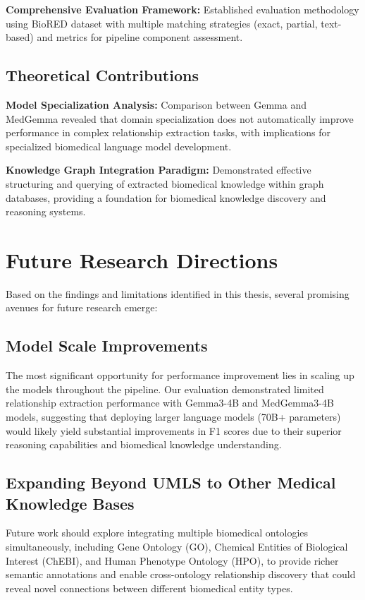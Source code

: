 \textbf{Comprehensive Evaluation Framework:} Established evaluation methodology using BioRED dataset with multiple matching strategies (exact, partial, text-based) and metrics for pipeline component assessment.

\subsection{Theoretical Contributions}

\textbf{Model Specialization Analysis:} Comparison between Gemma and MedGemma revealed that domain specialization does not automatically improve performance in complex relationship extraction tasks, with implications for specialized biomedical language model development.

\textbf{Knowledge Graph Integration Paradigm:} Demonstrated effective structuring and querying of extracted biomedical knowledge within graph databases, providing a foundation for biomedical knowledge discovery and reasoning systems.


\section{Future Research Directions}

Based on the findings and limitations identified in this thesis, several promising avenues for future research emerge:

\subsection{Model Scale Improvements}

The most significant opportunity for performance improvement lies in scaling up the models throughout the pipeline. Our evaluation demonstrated limited relationship extraction performance with Gemma3-4B and MedGemma3-4B models, suggesting that deploying larger language models (70B+ parameters) would likely yield substantial improvements in F1 scores due to their superior reasoning capabilities and biomedical knowledge understanding.

\subsection{Expanding Beyond UMLS to Other Medical Knowledge Bases}

Future work should explore integrating multiple biomedical ontologies simultaneously, including Gene Ontology (GO), Chemical Entities of Biological Interest (ChEBI), and Human Phenotype Ontology (HPO), to provide richer semantic annotations and enable cross-ontology relationship discovery that could reveal novel connections between different biomedical entity types.

